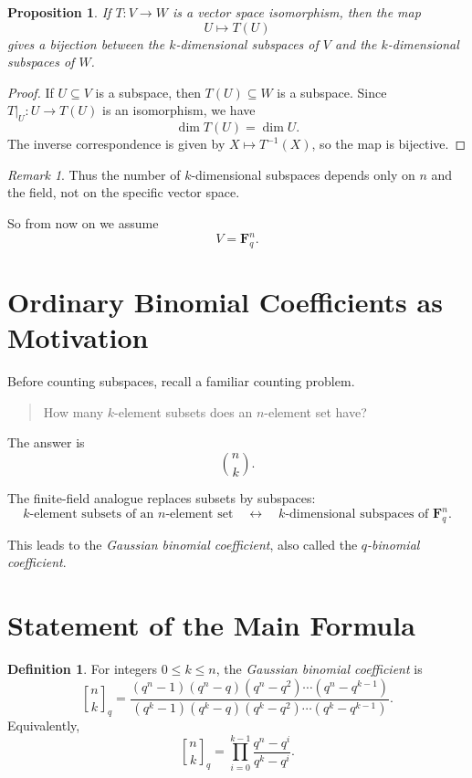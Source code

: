 \documentclass[11pt]{article}
\newtheorem{proposition}[theorem]{Proposition}
\theoremstyle{definition}
\newtheorem{definition}[theorem]{Definition}
\theoremstyle{remark}
\newtheorem{remark}[theorem]{Remark}
\newcommand{\F}{\mathbf{F}}
\newcommand{\qbinom}[2]{\genfrac{[}{]}{0pt}{}{#1}{#2}_q}
\begin{document}
	\begin{proposition}
		If \(T:V\to W\) is a vector space isomorphism, then the map
		\[
		U\longmapsto T(U)
		\]
		gives a bijection between the \(k\)-dimensional subspaces of \(V\) and the \(k\)-dimensional subspaces of \(W\).
	\end{proposition}
	
	\begin{proof}
		If \(U\subseteq V\) is a subspace, then \(T(U)\subseteq W\) is a subspace. Since \(T|_U:U\to T(U)\) is an isomorphism, we have
		\[
		\dim T(U)=\dim U.
		\]
		The inverse correspondence is given by \(X\mapsto T^{-1}(X)\), so the map is bijective.
	\end{proof}
	
	\begin{remark}
		Thus the number of \(k\)-dimensional subspaces depends only on \(n\) and the field, not on the specific vector space.
	\end{remark}
	
	So from now on we assume
	\[
	V=\F_q^n.
	\]
	
	\section{Ordinary Binomial Coefficients as Motivation}
	
	Before counting subspaces, recall a familiar counting problem.
	
	\begin{quote}
		How many \(k\)-element subsets does an \(n\)-element set have?
	\end{quote}
	
	The answer is
	\[
	\binom{n}{k}.
	\]
	
	The finite-field analogue replaces subsets by subspaces:
	\[
	\text{\(k\)-element subsets of an \(n\)-element set}
	\quad \longleftrightarrow \quad
	\text{\(k\)-dimensional subspaces of \(\F_q^n\)}.
	\]
	
	This leads to the \emph{Gaussian binomial coefficient}, also called the \emph{\(q\)-binomial coefficient}.
	
	\section{Statement of the Main Formula}
	
	\begin{definition}
		For integers \(0\le k\le n\), the \emph{Gaussian binomial coefficient} is
		\[
		\qbinom{n}{k}
		=
		\frac{(q^n-1)(q^n-q)(q^n-q^2)\cdots(q^n-q^{k-1})}
		{(q^k-1)(q^k-q)(q^k-q^2)\cdots(q^k-q^{k-1})}.
		\]
		Equivalently,
		\[
		\qbinom{n}{k}
		=
		\prod_{i=0}^{k-1}\frac{q^n-q^i}{q^k-q^i}.
		\]
	\end{definition}
	
\end{document}

